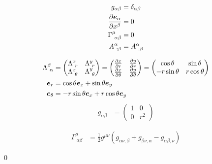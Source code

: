 \documentclass[uplatex,dvipdfmx,a4paper,11pt]{jlreq}
\makeatletter
\newcommand{\ee}{\bm{e}}
\theoremstyle{definition}
\renewenvironment{proof}[1][\proofname]{\par
  \normalfont
  \topsep6\p@\@plus6\p@ \trivlist
  \item[\hskip\labelsep{\bfseries #1}\@addpunct{\bfseries}]\ignorespaces\quad\par
}{%
  \qed\endtrivlist\@endpefalse
}
\renewcommand\proofname{証明}
\makeatother
\begin{document}
\begin{example}[デカルト座標]
  \begin{align}
    g_{\alpha\beta}             & = \delta_{\alpha\beta} \\
    \diffp{\ee_\alpha}{x^\beta} & = 0                    \\
    \Gamma^\mu_{\ \alpha\beta}  & = 0                    \\
    A^\alpha_{\ ;\beta}         & = A^\alpha_{\ ,\beta}
  \end{align}
\end{example}
\begin{example}[極座標]
  \begin{align}
    \Lambda_{\ \alpha}^\beta & =
    \begin{pmatrix}
      \Lambda_{\ r}^{x}      & \Lambda_{\ r}^{y}      \\
      \Lambda_{\ \theta}^{x} & \Lambda_{\ \theta}^{y}
    \end{pmatrix}
    =
    \begin{pmatrix}
      \diffp{x}{r}      & \diffp{y}{r}      \\
      \diffp{x}{\theta} & \diffp{y}{\theta}
    \end{pmatrix}
    =
    \begin{pmatrix}
      \cos\theta   & \sin\theta  \\
      -r\sin\theta & r\cos\theta
    \end{pmatrix}                                        \\
    \ee_r                    & = \cos\theta\ee_x + \sin\theta\ee_y    \\
    \ee_\theta               & = -r\sin\theta\ee_x + r\cos\theta\ee_y
  \end{align}
  \begin{align}
    g_{\alpha\beta} & = \begin{pmatrix}
                          1 & 0   \\
                          0 & r^2
                        \end{pmatrix}
  \end{align}
\end{example}

\begin{theorem}
  \begin{align}
    \Gamma^\mu_{\ \alpha\beta} & = \frac{1}{2}g^{\mu\nu}(g_{\alpha\nu,\beta} + g_{\beta\nu,\alpha} - g_{\alpha\beta,\nu})
  \end{align}
\end{theorem}
\begin{proof}

\end{proof}
\end{document}

